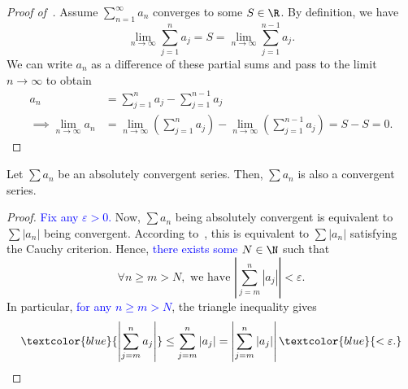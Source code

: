 \begin{proof}
	[Proof of~]
	Assume $\sum_{n=1}^\infty a_n$ converges to some $S\in\R$. By definition, we have
	\[
	\lim_{n\to \infty} \sum_{j=1}^n a_j = S = \lim_{n\to \infty} \sum_{j=1}^{n-1}a_j.
	\]
	We can write $a_n$ as a difference of these partial sums and pass to the limit $n\to \infty$ to obtain
	\begin{align*}
		a_n 	& = \sum_{j=1}^n a_j - \sum_{j=1}^{n-1}a_j 	\\
		\implies \lim_{n\to \infty} a_n 	&= \lim_{n\to \infty}\left(\sum_{j=1}^n a_j\right) - \lim_{n\to \infty}\left(\sum_{j=1}^{n-1} a_j\right) = S - S = 0.
	\end{align*}
\end{proof}
\begin{cor}
	\label{cor:abscvgseries}
	Let $\sum a_n$ be an absolutely convergent series. Then, $\sum a_n$ is also a convergent series.
\end{cor}
\begin{proof}
	\textcolor{blue}{Fix any $\varepsilon>0$.} Now, $\sum a_n$ being absolutely convergent is equivalent to $\sum |a_n|$ being convergent. According to~, this is equivalent to $\sum |a_n|$ satisfying the Cauchy criterion. Hence, \textcolor{blue}{there exists some $N\in\N$} such that
	\[
	\forall n\ge m>N,\text{ we have }\left|\sum_{j=m}^n|a_j|\right| <\varepsilon.
	\]
	In particular, \textcolor{blue}{for any $n\ge m>N$}, the triangle inequality gives
	\[
	\textcolor{blue}{\left|\sum_{j=m}^na_j\right|} \le \sum_{j=m}^n |a_j| = \left|\sum_{j=m}^n|a_j|\right| \textcolor{blue}{< \varepsilon.}
	\]
\end{proof}
